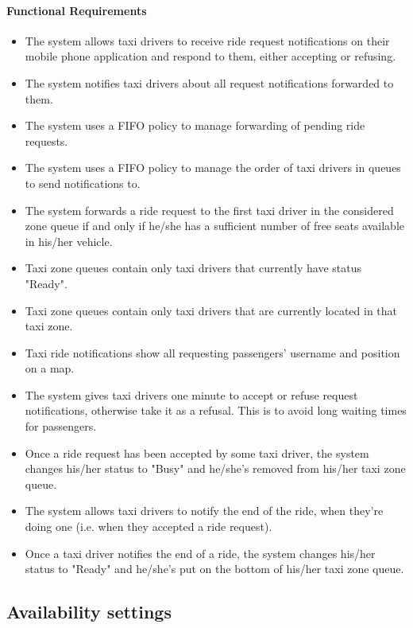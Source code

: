 	\paragraph{Functional Requirements}
		\begin{itemize}
			\item The system allows taxi drivers to receive ride request notifications on their mobile phone application and respond to them, either accepting or refusing.
			\item The system notifies taxi drivers about all request notifications forwarded to them.
			\item The system uses a FIFO policy to manage forwarding of pending ride requests.
			\item The system uses a FIFO policy to manage the order of taxi drivers in queues to send notifications to.
			\item The system forwards a ride request to the first taxi driver in the considered zone queue if and only if he/she has a sufficient number of free seats available in his/her vehicle.
			\item Taxi zone queues contain only taxi drivers that currently have status "Ready".
			\item Taxi zone queues contain only taxi drivers that are currently located in that taxi zone.
			\item Taxi ride notifications show all requesting passengers' username and position on a map.
			\item The system gives taxi drivers one minute to accept or refuse request notifications, otherwise take it as a refusal. This is to avoid long waiting times for passengers.
			\item Once a ride request has been accepted by some taxi driver, the system changes his/her status to "Busy" and he/she's removed from his/her taxi zone queue.
			\item The system allows taxi drivers to notify the end of the ride, when they're doing one (i.e. when they accepted a ride request).
			\item Once a taxi driver notifies the end of a ride, the system changes his/her status to "Ready" and he/she's put on the bottom of his/her taxi zone queue.
		\end{itemize}

\subsection{Availability settings}
